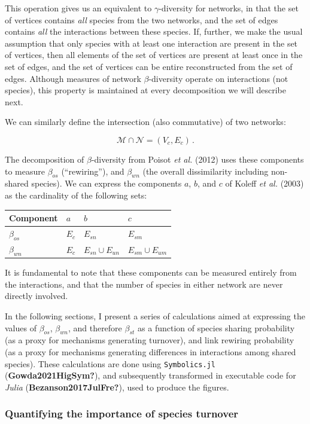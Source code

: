 \documentclass[10pt,oneside]{article}
\begin{document}
This operation gives us an equivalent to \(\gamma\)-diversity for
networks, in that the set of vertices contains \emph{all} species from
the two networks, and the set of edges contains \emph{all} the
interactions between these species. If, further, we make the usual
assumption that only species with at least one interaction are present
in the set of vertices, then all elements of the set of vertices are
present at least once in the set of edges, and the set of vertices can
be entire reconstructed from the set of edges. Although measures of
network \(\beta\)-diversity operate on interactions (not species), this
property is maintained at every decomposition we will describe next.

We can similarly define the intersection (also commutative) of two
networks:

\[\mathcal{M} \cap \mathcal{N} = (V_c, E_c)\,.\]

The decomposition of \(\beta\)-diversity from Poisot \emph{et al.}
(2012) uses these components to measure \(\beta_{os}\) (``rewiring''),
and \(\beta_{wn}\) (the overall dissimilarity including non-shared
species). We can express the components \(a\), \(b\), and \(c\) of
Koleff \emph{et al.} (2003) as the cardinality of the following sets:

\begin{longtable}[]{@{}llll@{}}
\toprule
Component & \(a\) & \(b\) & \(c\)\tabularnewline
\midrule
\endhead
\(\beta_{os}\) & \(E_c\) & \(E_{sn}\) & \(E_{sm}\)\tabularnewline
\(\beta_{wn}\) & \(E_c\) & \(E_{sn} \cup E_{un}\) &
\(E_{sm} \cup E_{um}\)\tabularnewline
\bottomrule
\end{longtable}

It is fundamental to note that these components can be measured entirely
from the interactions, and that the number of species in either network
are never directly involved.

In the following sections, I present a series of calculations aimed at
expressing the values of \(\beta_{os}\), \(\beta_{wn}\), and therefore
\(\beta_{st}\) as a function of species sharing probability (as a proxy
for mechanisms generating turnover), and link rewiring probability (as a
proxy for mechanisms generating differences in interactions among shared
species). These calculations are done using \texttt{Symbolics.jl}
(\textbf{Gowda2021HigSym?}), and subsequently transformed in executable
code for \emph{Julia} (\textbf{Bezanson2017JulFre?}), used to produce
the figures.

\hypertarget{quantifying-the-importance-of-species-turnover}{%
\subsubsection{Quantifying the importance of species
turnover}\label{quantifying-the-importance-of-species-turnover}}
\end{document}
